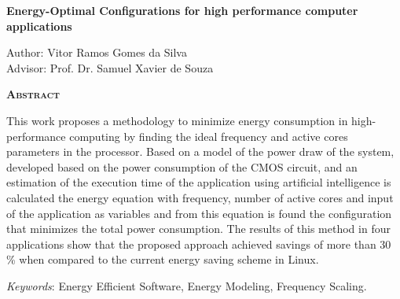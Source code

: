 \begin{center}
	{\Large{\textbf{Energy-Optimal Configurations for high performance computer applications}}}
\end{center}

\vspace{1cm}

\begin{flushright}
	Author: Vitor Ramos Gomes da Silva\\
	Advisor: Prof. Dr. Samuel Xavier de Souza
\end{flushright}

\vspace{1cm}

\begin{center}
	\Large{\textsc{\textbf{Abstract}}}
\end{center}

\noindent This work proposes a methodology to minimize energy consumption
in high-performance computing by finding the ideal frequency and active cores parameters in the processor. Based on a model of the power draw of the system, developed based on the power consumption of the CMOS circuit, and an estimation of the execution time of the application using artificial intelligence is calculated the energy equation with frequency, number of active cores and input of the application as variables and from this equation is found the configuration that minimizes the total power consumption. The results of this method in four applications show that the proposed approach achieved savings of more than 30 \% when compared to the current energy saving scheme in Linux.

\noindent\textit{Keywords}: 
Energy Efficient Software, Energy Modeling, Frequency Scaling.